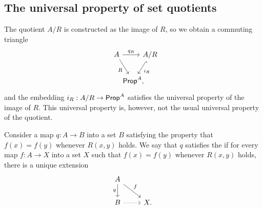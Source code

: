 \begin{comment}
Note that $\varphi_a(\lam{x}\idfunc[(a=x)])\jdeq\refl{a}$. Therefore it follows by another application of \cref{thm:yoneda} that the unique family of maps 
\begin{equation*}
\alpha_b:(a=b)\to \Big(\prd{x:A} \eqv{(b=x)}{(a=x)}\Big)
\end{equation*}
that satisfies $\alpha_a(\refl{a})=\lam{x}\idfunc[(a=x)]$ is a family of sections of $\varphi$. 
It follows that $\alpha$ is a family of equivalences. Now the proof is completed by reverting the direction of the family of equivalences in the codomain.
\end{proof}
\end{comment}

\subsection{The universal property of set quotients}

The quotient $A/R$ is constructed as the image of $R$, so we obtain a commuting triangle
\begin{equation*}
  \begin{tikzcd}[column sep=-1em]
    A \arrow[rr,"q_R"] \arrow[dr,swap,"R"] & & A/R \arrow[dl,hook,"i_R"] \\
    \phantom{A/R} & \prop^A,
  \end{tikzcd}
\end{equation*}
and the embedding $i_R:A/R\to\mathsf{Prop}^A$ satisfies the universal property of the image of $R$. This universal property is, however, not the usual universal property of the quotient.

\begin{defn}
  Consider a map $q:A\to B$ into a set $B$ satisfying the property that $f(x)=f(y)$ whenever $R(x,y)$ holds. We say that $q$ satisfies the  if for every map $f:A\to X$ into a set $X$ such that $f(x)=f(y)$ whenever $R(x,y)$ holds, there is a unique extension
  \begin{equation*}
    \begin{tikzcd}
      A \arrow[d,swap,"q"] \arrow[dr,"f"] \\
      B \arrow[r,densely dotted] & X.
    \end{tikzcd}
  \end{equation*}
\end{defn}

